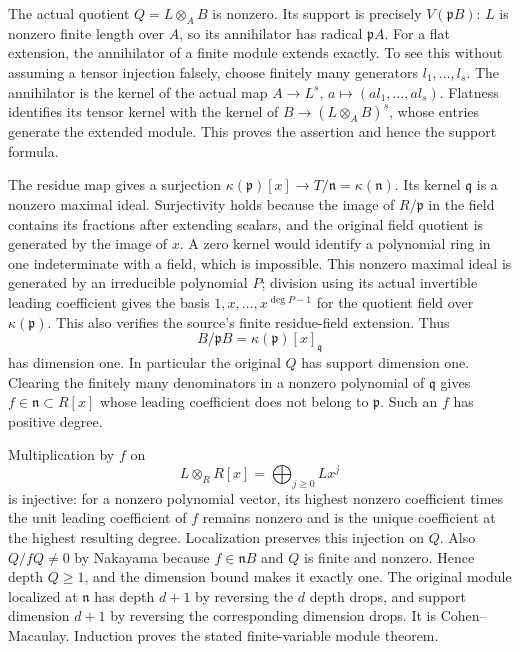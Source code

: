 The actual quotient \(Q=L\otimes_A B\) is nonzero. Its support is precisely \(V(\mathfrak pB)\): \(L\) is nonzero finite length over \(A\), so its annihilator has radical \(\mathfrak pA\). For a flat extension, the annihilator of a finite module extends exactly. To see this without assuming a tensor injection falsely, choose finitely many generators \(l_1,\ldots,l_s\). The annihilator is the kernel of the actual map \(A\to L^s\), \(a\mapsto(al_1,\ldots,al_s)\). Flatness identifies its tensor kernel with the kernel of \(B\to(L\otimes_A B)^s\), whose entries generate the extended module. This proves the assertion and hence the support formula.

The residue map gives a surjection \(\kappa(\mathfrak p)[x]\to T/\mathfrak n=\kappa(\mathfrak n)\). Its kernel \(\mathfrak q\) is a nonzero maximal ideal. Surjectivity holds because the image of \(R/\mathfrak p\) in the field contains its fractions after extending scalars, and the original field quotient is generated by the image of \(x\). A zero kernel would identify a polynomial ring in one indeterminate with a field, which is impossible. This nonzero maximal ideal is generated by an irreducible polynomial \(P\); division using its actual invertible leading coefficient gives the basis \(1,x,\ldots,x^{\deg P-1}\) for the quotient field over \(\kappa(\mathfrak p)\). This also verifies the source's finite residue-field extension. Thus \[
 B/\mathfrak pB=\kappa(\mathfrak p)[x]_{\mathfrak q}
\] has dimension one. In particular the original \(Q\) has support dimension one. Clearing the finitely many denominators in a nonzero polynomial of \(\mathfrak q\) gives \(f\in\mathfrak n\subset R[x]\) whose leading coefficient does not belong to \(\mathfrak p\). Such an \(f\) has positive degree.

Multiplication by \(f\) on \[
 L\otimes_R R[x]=\bigoplus_{j\ge0}Lx^j
\] is injective: for a nonzero polynomial vector, its highest nonzero coefficient times the unit leading coefficient of \(f\) remains nonzero and is the unique coefficient at the highest resulting degree. Localization preserves this injection on \(Q\). Also \(Q/fQ\ne0\) by Nakayama because \(f\in\mathfrak nB\) and \(Q\) is finite and nonzero. Hence depth \(Q\ge1\), and the dimension bound makes it exactly one. The original module localized at \(\mathfrak n\) has depth \(d+1\) by reversing the \(d\) depth drops, and support dimension \(d+1\) by reversing the corresponding dimension drops. It is Cohen--Macaulay. Induction proves the stated finite-variable module theorem.

